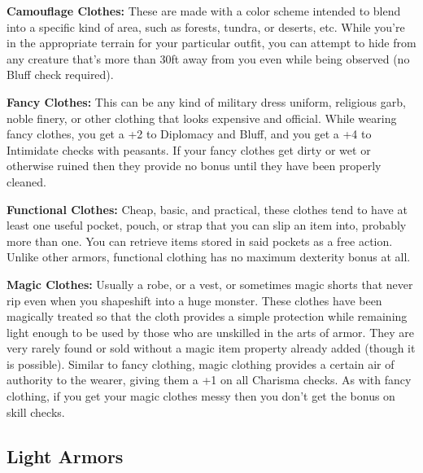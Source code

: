\textbf{Camouflage Clothes:} These are made with a color scheme intended to blend into a specific kind of area, such as forests, tundra, or deserts, etc. While you're in the appropriate terrain for your particular outfit, you can attempt to hide from any creature that's more than 30ft away from you even while being observed (no Bluff check required).

\textbf{Fancy Clothes:} This can be any kind of military dress uniform, religious garb, noble finery, or other clothing that looks expensive and official. While wearing fancy clothes, you get a +2 to Diplomacy and Bluff, and you get a +4 to Intimidate checks with peasants. If your fancy clothes get dirty or wet or otherwise ruined then they provide no bonus until they have been properly cleaned.

\textbf{Functional Clothes:} Cheap, basic, and practical, these clothes tend to have at least one useful pocket, pouch, or strap that you can slip an item into, probably more than one. You can retrieve items stored in said pockets as a free action. Unlike other armors, functional clothing has no maximum dexterity bonus at all.

\textbf{Magic Clothes:} Usually a robe, or a vest, or sometimes magic shorts that never rip even when you shapeshift into a huge monster. These clothes have been magically treated so that the cloth provides a simple protection while remaining light enough to be used by those who are unskilled in the arts of armor. They are very rarely found or sold without a magic item property already added (though it is possible). Similar to fancy clothing, magic clothing provides a certain air of authority to the wearer, giving them a +1 on all Charisma checks. As with fancy clothing, if you get your magic clothes messy then you don't get the bonus on skill checks.

\subsection{Light Armors}

